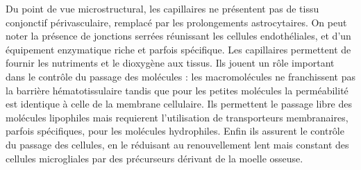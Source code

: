 Du point de vue microstructural, les capillaires ne présentent pas de tissu conjonctif périvasculaire, remplacé par les prolongements astrocytaires. On peut noter la présence de jonctions serrées réunissant les cellules endothéliales, et d’un équipement enzymatique riche et parfois spécifique. Les capillaires permettent de fournir les nutriments et le dioxygène aux tissus. Ils jouent un rôle important dans le contrôle du passage des molécules : les macromolécules ne franchissent pas la barrière hématotissulaire tandis que pour les petites molécules la perméabilité est identique à celle de la membrane cellulaire. Ils permettent le passage libre des molécules lipophiles mais requierent l’utilisation de transporteurs membranaires, parfois spécifiques, pour les molécules hydrophiles. Enfin ils assurent le contrôle du passage des cellules, en le réduisant au renouvellement lent mais constant des cellules microgliales par des précurseurs dérivant de la moelle osseuse.\\
